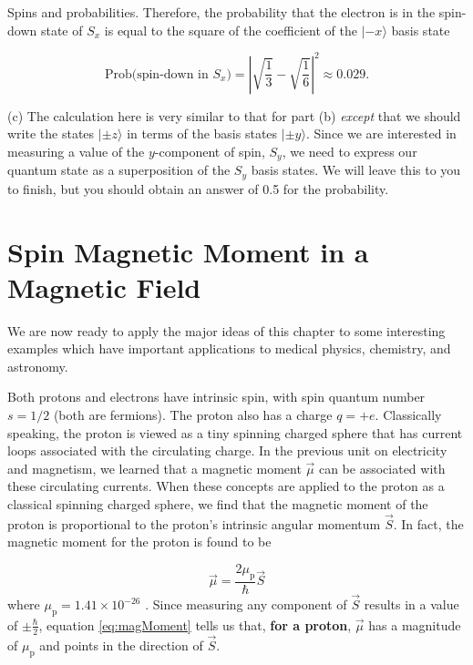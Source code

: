 \begin{example}{Spins and probabilities.}
Therefore, the probability that the electron is in the spin-down state of $S_x$ is equal to the square of the coefficient of the $|\mbox{$-x$}\rangle$ basis state

\begin{equation}
\mbox{Prob}\bigl(\mbox{spin-down in $S_x$}\bigr) = \left|\sqrt{\frac{1}{3}} - \sqrt{\frac{1}{6}}\right|^2 \approx 0.029 .
\end{equation} 

(c) The calculation here is very similar to that for part (b) {\em except}
that we should write the states $|\mbox{$\pm z$}\rangle$ in terms of
the basis states $|\mbox{$\pm y$}\rangle$.  Since we are interested
in measuring a value of the $y$-component of spin, $S_y$, we need to
express our quantum state as a superposition of the $S_y$ basis states.
We will leave this to you to finish, but you should obtain an answer of
0.5 for the probability.  
\end{example}

\section{Spin Magnetic Moment in a Magnetic Field}

We are now ready to apply the major ideas of this chapter to
some interesting examples which have important applications to 
medical physics, chemistry, and astronomy.

Both protons and electrons have intrinsic spin, with spin quantum
number $s = 1/2$ (both are fermions).  
The proton also has a charge $q = +e$.
Classically speaking, the proton is viewed as a tiny spinning charged
sphere that has current loops associated with the circulating charge.
In the previous unit on electricity and magnetism, we learned that a
magnetic moment $\vec{\mu}$ can be associated with these circulating
currents.  When these concepts are applied to the proton as a classical
spinning charged sphere, we find that the magnetic moment of the proton
is proportional to the proton's intrinsic angular momentum $\vec{S}$.
In fact, the magnetic moment for the proton is found to be

\begin{equation}
\vec{\mu} = \frac{2 \mu_\text{p}}{\hbar} \vec{S}
\label{eq:magMoment}
\end{equation}
where $\mu_\text{p} = 1.41 \times 10^{-26}$ .  Since measuring any component of $\vec{S}$ results in a value of $\pm \frac{\hbar}{2}$, equation \ref{eq:magMoment} tells us that, {\bf for a proton}, $\vec{\mu}$ has a magnitude of $\mu_\text{p}$ and points in the direction of $\vec{S}$.

